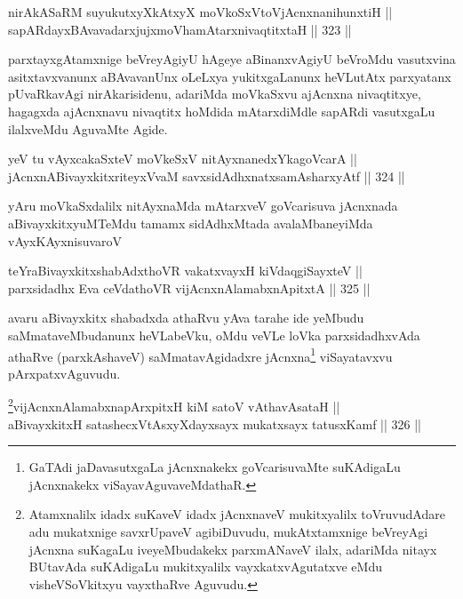 \begin{shl}
nirAkASaRM suyukutxyXkAtxyX moVkoSxV\s toV\s jAcnxnanihunxtiH || \\
sapARdayxBAvavadarxjujxmoVhamAtarxnivaqtitxtaH \hfill || 323 ||  
\end{shl}

\begin{artha}
parxtayxgAtamxnige beVreyAgiyU hAgeye aBinanxvAgiyU beVroMdu
vasutxvina asitxtavxvanunx aBAvavanUnx oLeLxya yukitxgaLanunx
heVLutAtx parxyatanx pUvaRkavAgi nirAkarisidenu, adariMda moVkaSxvu
ajAcnxna nivaqtitxye, hagagxda ajAcnxnavu nivaqtitx hoMdida
mAtarxdiMdle sapARdi vasutxgaLu ilalxveMdu AguvaMte Agide.
\end{artha}


\begin{shl}
yeV tu vAyxcakaSxteV moVkeSxV nitAyxnanedxYkagoVcarA || \\
jAcnxnABivayxkitxriteyxVvaM savxsidAdhxnatxsamAsharxyAtf \hfill || 324 ||  
\end{shl}

\begin{artha}
yAru moVkaSxdalilx nitAyxnaMda mAtarxveV goVcarisuva jAcnxnada
aBivayxkitxyuMTeMdu tamamx sidAdhxMtada avalaMbaneyiMda vAyxKAyxnisuvaroV
\end{artha}

\begin{shl}
teYraBivayxkitxshabAdxthoVR vakatxvayxH kiVdaqgiSayxteV || \\
parxsidadhx Eva ceVdathoVR vijAcnxnAlamabxnApitxtA \hfill || 325 ||  
\end{shl}

\begin{artha}
avaru aBivayxkitx shabadxda athaRvu yAva tarahe ide yeMbudu
saMmataveMbudanunx heVLabeVku, oMdu veVLe loVka parxsidadhxvAda
athaRve (parxkAshaveV) saMmatavAgidadxre jAcnxna\footnote{GaTAdi
jaDavasutxgaLa jAcnxnakekx goVcarisuvaMte suKAdigaLu jAcnxnakekx
viSayavAguvaveMdathaR.} viSayatavxvu pArxpatxvAguvudu.
\end{artha}



\begin{shl}
\footnote{Atamxnalilx idadx suKaveV idadx jAcnxnaveV mukitxyalilx
toVruvudAdare adu mukatxnige savxrUpaveV agibiDuvudu, mukAtxtamxnige
beVreyAgi jAcnxna suKagaLu iveyeMbudakekx parxmANaveV ilalx, adariMda
nitayx BUtavAda suKAdigaLu mukitxyalilx vayxkatxvAgutatxve eMdu
visheVSoVkitxyu vayxthaRve Aguvudu.}vijAcnxnAlamabxnapArxpitxH kiM satoV vA\s thavA\s sataH || \\
aBivayxkitxH satashecxVtAsxyXdayxsayx mukatxsayx tatusxKamf \hfill || 326 ||  
\end{shl}

